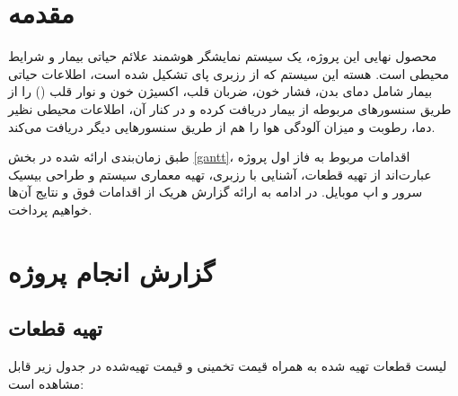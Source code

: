 \documentclass[12pt]{article}
\begin{document}
\newpage
\pagestyle{fancy}
\fancyhf{}
\fancyfoot{}
\cfoot{\thepage}
\chead{}

\newfontfamily{}

\KashidaOff
 \newcommand{\inlineLatin}[1]{
	\small{\lr{{\terminal #1}}}
}


\tableofcontents
\listoffigures

\newpage
\section{مقدمه}


محصول نهایی این پروژه، یک سیستم نمایشگر هوشمند علائم حیاتی بیمار و شرایط محیطی است. هسته این سیستم که از رزبری پای تشکیل شده است، اطلاعات حیاتی بیمار شامل دمای بدن، فشار خون، ضربان قلب، اکسیژن خون و نوار قلب () را از طریق سنسور‌های مربوطه از بیمار دریافت کرده و در کنار آن، اطلاعات محیطی نظیر دما،‌ رطوبت و میزان آلودگی هوا را هم از طریق سنسورهایی دیگر دریافت می‌کند.

طبق زمان‌بندی ارائه شده در بخش \ref{gantt}، اقدامات مربوط به فاز اول پروژه عبارت‌اند از تهیه قطعات، آشنایی با رزبری، تهیه معماری سیستم و طراحی بیسیک سرور و اپ موبایل.
در ادامه به ارائه گزارش هریک از اقدامات فوق و نتایج آن‌ها خواهیم پرداخت.

\section{گزارش انجام پروژه}
\subsection{تهیه قطعات}

لیست قطعات تهیه شده به همراه قیمت تخمینی و قیمت تهیه‌شده در جدول زیر قابل مشاهده است:
\end{document}
